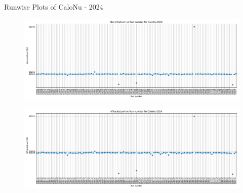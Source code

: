 \begin{frame}{Runwise Plots of CaloNu - 2024}
    \begin{figure}
        \centering
        \includegraphics[width=1.0\textwidth]{plots_runwise/NEventsbyLumi_2024_CaloNu.pdf}
    \end{figure}
    \vspace{-0.35cm}
    \begin{figure}
        \centering
        \includegraphics[width=1.0\textwidth]{plots_runwise/NTracksbyLumi_2024_CaloNu.pdf}
    \end{figure}
\end{frame}


